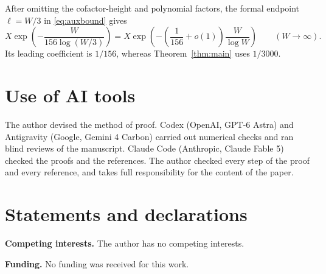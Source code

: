 \documentclass{amsart}
\theoremstyle{remark}
\numberwithin{equation}{section}
\begin{document}
After omitting the cofactor-height and polynomial factors, the formal
endpoint $\ell=W/3$ in \eqref{eq:auxbound} gives
\[
X\exp\!\left(-\frac{W}{156\log(W/3)}\right)
=X\exp\!\left(-\left(\frac1{156}+o(1)\right)
                       \frac{W}{\log W}\right)
\qquad(W\to\infty).
\]
Its leading coefficient is $1/156$, whereas Theorem~\ref{thm:main} uses $1/3000$.

\section*{Use of AI tools}

The author devised the method of proof. Codex (OpenAI, GPT-6 Astra) and
Antigravity (Google, Gemini 4 Carbon) carried out numerical checks and ran
blind reviews of the manuscript. Claude Code (Anthropic, Claude Fable 5)
checked the proofs and the references. The author checked every step of the
proof and every reference, and takes full responsibility for the content of
the paper.

\section*{Statements and declarations}

\textbf{Competing interests.} The author has no competing interests.

\textbf{Funding.} No funding was received for this work.

\renewcommand{\bibliofont}{\footnotesize\setlength{\baselineskip}{9pt}}
\makeatletter
\renewcommand{\@bibtitlestyle}{%
  \@startsection{section}{1}{\z@}{4pt}{3pt}%
    {\normalfont\scshape\centering}*{\refname}}
\renewcommand{\@setaddresses}{\par\nobreak\begingroup
  \footnotesize
  \def\author##1{}%
  \def\email##1##2{\@ifnotempty{##2}{\textit{\emailaddrname}:\space
    \texttt{##2}}}%
  \def\address##1##2{\@ifnotempty{##2}{\unskip\quad
    {\scshape\ignorespaces##2\unskip}}}%
  \noindent\addresses\par\endgroup}
\makeatother


\end{document}

